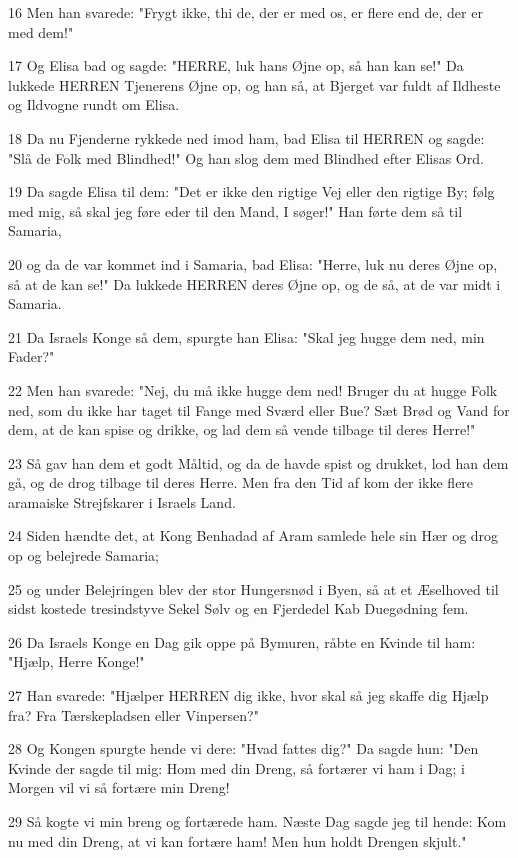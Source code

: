 \par 16 Men han svarede: "Frygt ikke, thi de, der er med os, er flere end de, der er med dem!"
\par 17 Og Elisa bad og sagde: "HERRE, luk hans Øjne op, så han kan se!" Da lukkede HERREN Tjenerens Øjne op, og han så, at Bjerget var fuldt af Ildheste og Ildvogne rundt om Elisa.
\par 18 Da nu Fjenderne rykkede ned imod ham, bad Elisa til HERREN og sagde: "Slå de Folk med Blindhed!" Og han slog dem med Blindhed efter Elisas Ord.
\par 19 Da sagde Elisa til dem: "Det er ikke den rigtige Vej eller den rigtige By; følg med mig, så skal jeg føre eder til den Mand, I søger!" Han førte dem så til Samaria,
\par 20 og da de var kommet ind i Samaria, bad Elisa: "Herre, luk nu deres Øjne op, så at de kan se!" Da lukkede HERREN deres Øjne op, og de så, at de var midt i Samaria.
\par 21 Da Israels Konge så dem, spurgte han Elisa: "Skal jeg hugge dem ned, min Fader?"
\par 22 Men han svarede: "Nej, du må ikke hugge dem ned! Bruger du at hugge Folk ned, som du ikke har taget til Fange med Sværd eller Bue? Sæt Brød og Vand for dem, at de kan spise og drikke, og lad dem så vende tilbage til deres Herre!"
\par 23 Så gav han dem et godt Måltid, og da de havde spist og drukket, lod han dem gå, og de drog tilbage til deres Herre. Men fra den Tid af kom der ikke flere aramaiske Strejfskarer i Israels Land.
\par 24 Siden hændte det, at Kong Benhadad af Aram samlede hele sin Hær og drog op og belejrede Samaria;
\par 25 og under Belejringen blev der stor Hungersnød i Byen, så at et Æselhoved til sidst kostede tresindstyve Sekel Sølv og en Fjerdedel Kab Duegødning fem.
\par 26 Da Israels Konge en Dag gik oppe på Bymuren, råbte en Kvinde til ham: "Hjælp, Herre Konge!"
\par 27 Han svarede: "Hjælper HERREN dig ikke, hvor skal så jeg skaffe dig Hjælp fra? Fra Tærskepladsen eller Vinpersen?"
\par 28 Og Kongen spurgte hende vi dere: "Hvad fattes dig?" Da sagde hun: "Den Kvinde der sagde til mig: Hom med din Dreng, så fortærer vi ham i Dag; i Morgen vil vi så fortære min Dreng!
\par 29 Så kogte vi min breng og fortærede ham. Næste Dag sagde jeg til hende: Kom nu med din Dreng, at vi kan fortære ham! Men hun holdt Drengen skjult."
